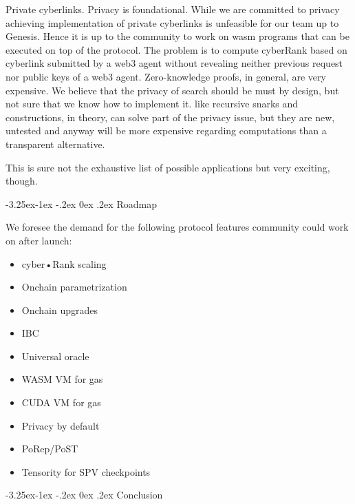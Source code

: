 \documentclass[8pt,oneside]{amsart}
\makeatletter
\newcommand{\linkgreen}[2]{\href{#1}{\color{green}{#2}}}
\renewcommand\subsection{\@startsection{subsection}{2}{\z@}%
                                     {-3.25ex\@plus -1ex \@minus -.2ex}%
                                     {0ex \@plus .2ex}%
                                     {\play\Large}}%
\newcommand{\titleSection}[1]{\subsection{#1}}
\newcommand{\code}[1]{{\PlayBold #1}}
\makeatother
\begin{document}
\code{Private cyberlinks}. Privacy is foundational. While we are committed to privacy achieving implementation of private cyberlinks is unfeasible for our team up to Genesis. Hence it is up to the community to work on wasm programs that can be executed on top of the protocol. The problem is to compute cyberRank based on cyberlink submitted by a web3 agent without revealing neither previous request nor public keys of a web3 agent. Zero-knowledge proofs, in general, are very expensive. We believe that the privacy of search should be must by design, but not sure that we know how to implement it. \linkgreen{https://ipfs.io/ipfs/Qmdje3AmtsfjX9edWAxo3LFhV9CTAXoUvwGR7wHJXnc2Gk}{Coda} like recursive snarks and \linkgreen{https://ipfs.io/ipfs/Qmd99xmraYip9cVv8gRMy6Y97Bkij8qUYArGDME7CzFasg}{mimblewimble} constructions, in theory, can solve part of the privacy issue, but they are new, untested and anyway will be more expensive regarding computations than a transparent alternative.

This is sure not the exhaustive list of possible applications but very exciting, though.

\titleSection{Roadmap}\label{Roadmap}

We foresee the demand for the following protocol features community could work on after launch:

\begin{itemize}
\item cyber•Rank scaling
\item Onchain parametrization
\item Onchain upgrades
\item IBC
\item Universal oracle
\item WASM VM for gas
\item CUDA VM for gas
\item Privacy by default
\item PoRep/PoST
\item Tensority for SPV checkpoints

\end{itemize}

\titleSection{Conclusion}\label{Conclusion}
\end{document}
